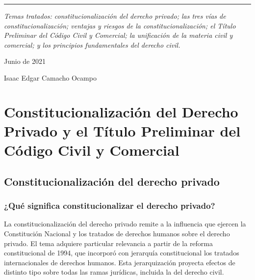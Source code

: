 \documentclass[12pt,oneside]{book}
\newcommand{\autor}{Isaac Edgar Camacho Ocampo}
\newcommand{\fechaclase}{Junio de 2021}
\begin{document}
\begin{titlepage}
\begin{flushright}
    \rule{0.70\textwidth}{0.5pt}

    \vspace{1cm}

    {\normalsize \textit{Temas tratados: constitucionalización del derecho privado; las tres vías de constitucionalización; ventajas y riesgos de la constitucionalización; el Título Preliminar del Código Civil y Comercial; la unificación de la materia civil y comercial; y los principios fundamentales del derecho civil.}}

    \vfill
\end{flushright}

    {\large \fechaclase}

    \vspace{0.3cm}

    {\large \autor}

    \vspace{0.3cm}



\end{titlepage}


\tableofcontents

\clearpage


\chapter{Constitucionalización del Derecho Privado y el Título Preliminar del Código Civil y Comercial}

\section{Constitucionalización del derecho privado}

\subsection{¿Qué significa constitucionalizar el derecho privado?}

La constitucionalización del derecho privado remite a la influencia que ejercen la Constitución Nacional y los tratados de derechos humanos sobre el derecho privado. El tema adquiere particular relevancia a partir de la reforma constitucional de 1994, que incorporó con jerarquía constitucional los tratados internacionales de derechos humanos. Esta jerarquización proyecta efectos de distinto tipo sobre todas las ramas jurídicas, incluida la del derecho civil.
\end{document}

